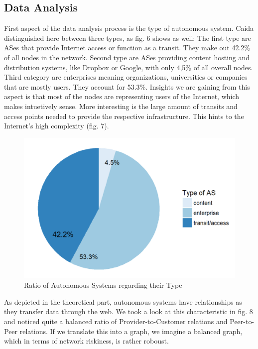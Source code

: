 \documentclass[conference, 11pt]{IEEEtran}
\begin{document}
\subsection{Data Analysis}
First aspect of the data analysis process is the type of autonomous system. Caida distinguished here between three types, as fig. 6 shows as well: The first type are ASes that provide Internet access or function as a transit. They make out 42.2\% of all nodes in the network. Second type are ASes providing content hosting and distribution systems, like Dropbox or Google, with only 4,5\% of all overall nodes. Third category are enterprises meaning organizations, universities or companies that are mostly users. They account for 53.3\%. Insights we are gaining from this aspect is that most of the nodes are representing users of the Internet, which makes intuetively sense. More interesting is the large amount of transits and access points needed to provide the respective infrastructure. This hints to the Internet's high complexity (fig. 7).

\vspace{0.5cm}
\begin{figure}[htbp]
\centerline{\includegraphics[scale=0.4]{Graphics/typeofAS.PNG}}
\caption{Ratio of Autonomous Systems regarding their Type }
\label{fig}
\end{figure}
\vspace{0.5cm}

As depicted in the theoretical part, autonomous systems have relationships as they transfer data through the web. We took a look at this characteristic in fig. 8 and noticed quite a balanced ratio of Provider-to-Customer relations and Peer-to-Peer relations. If we translate this into a graph, we imagine a balanced graph, which in terms of network riskiness, is rather roboust. 
\end{document}
